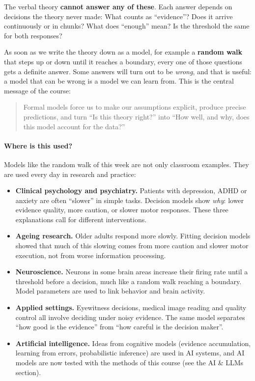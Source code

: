 The verbal theory \textbf{cannot answer any of these}. Each answer
depends on decisions the theory never made: What counts as ``evidence''?
Does it arrive continuously or in chunks? What does ``enough'' mean? Is
the threshold the same for both responses?

As soon as we write the theory down as a model, for example a
\textbf{random walk} that steps up or down until it reaches a boundary,
every one of those questions gets a definite answer. Some answers will
turn out to be \emph{wrong}, and that is useful: a model that can be
wrong is a model we can learn from. This is the central message of the
course:

\begin{quote}
Formal models force us to make our assumptions explicit, produce precise
predictions, and turn ``Is this theory right?'' into ``How well, and
why, does this model account for the data?''
\end{quote}

\paragraph{Where is this used?}

Models like the random walk of this week are not only classroom
examples. They are used every day in research and practice:

\begin{itemize}
\tightlist
\item
  \textbf{Clinical psychology and psychiatry.} Patients with depression,
  ADHD or anxiety are often ``slower'' in simple tasks. Decision models
  show \emph{why}: lower evidence quality, more caution, or slower motor
  responses. These three explanations call for different interventions.
\item
  \textbf{Ageing research.} Older adults respond more slowly. Fitting
  decision models showed that much of this slowing comes from more
  caution and slower motor execution, not from worse information
  processing.
\item
  \textbf{Neuroscience.} Neurons in some brain areas increase their
  firing rate until a threshold before a decision, much like a random
  walk reaching a boundary. Model parameters are used to link behavior
  and brain activity.
\item
  \textbf{Applied settings.} Eyewitness decisions, medical image reading
  and quality control all involve deciding under noisy evidence. The
  same model separates ``how good is the evidence'' from ``how careful
  is the decision maker''.
\item
  \textbf{Artificial intelligence.} Ideas from cognitive models
  (evidence accumulation, learning from errors, probabilistic inference)
  are used in AI systems, and AI models are now tested with the methods
  of this course (see the AI \& LLMs section).
\end{itemize}

